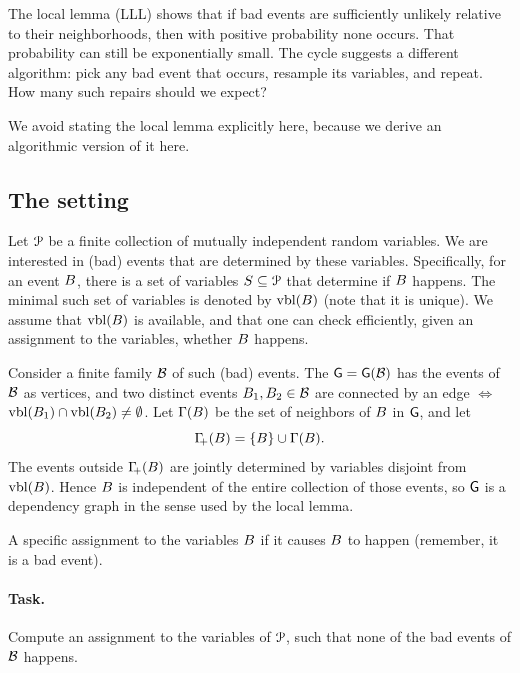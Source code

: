 The \Lovasz local lemma (LLL) shows that if bad events are sufficiently
unlikely relative to their neighborhoods, then with positive probability
none occurs. That probability can still be exponentially small. The
cycle suggests a different algorithm: pick any bad event that occurs,
resample its variables, and repeat. How many such repairs should we expect?

We avoid stating the \Lovasz local lemma explicitly here, because we
derive an algorithmic version of it here.

\subsection{The setting}

Let $\EuScript{P}$ be a finite collection of mutually independent random
variables. We are interested in (bad) events that are determined by
these variables. Specifically, for an event ${B}$, there is a set
of variables $S \subseteq \EuScript{P}$ that determine if ${B}$
happens. The minimal such set of variables is denoted by
$\vblX{\BEvent}$ (note that it is unique). We assume that
$\vblX{\BEvent}$ is available, and that one can check efficiently,
given an assignment to the variables, whether ${B}$ happens.

Consider a finite family $\mathcal{B}$ of such (bad) events. The
$\mathsf{G} = \mathsf{G}(\mathcal{B})$ has the events of $\mathcal{B}$ as
vertices, and two distinct events ${B}_1,{B}_2 \in \mathcal{B}$
are connected by an edge $\iff$
$\vblX{\BEvent_1} \cap \vblX{\BEvent_2} \neq \emptyset$. Let
$\NbrX{\BEvent}$ be the set of neighbors of ${B}$ in $\mathsf{G}$, and
let
\begin{equation*}
    \NbrCX{\BEvent} = \brc{\BEvent} \cup \NbrX{\BEvent}.
\end{equation*}
The events
outside $\NbrCX{\BEvent}$ are jointly determined by variables disjoint
from $\vblX{\BEvent}$. Hence ${B}$ is independent of the entire
collection of those events, so $\mathsf{G}$ is a dependency
graph in the sense used by the \Lovasz local lemma.

A specific assignment to the variables
 ${B}$ if it causes ${B}$
to happen (remember, it is a bad event).

\paragraph*{Task.}
Compute an assignment to the variables of $\EuScript{P}$, such that none of
the bad events of $\mathcal{B}$ happens.

